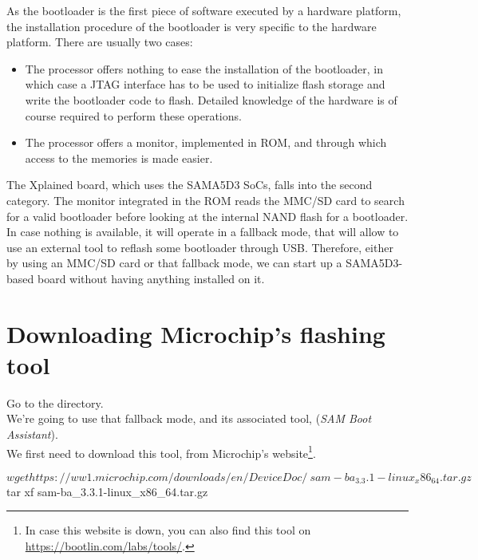 
As the bootloader is the first piece of software executed by a
hardware platform, the installation procedure of the bootloader is
very specific to the hardware platform. There are usually two cases:

\begin{itemize}

\item The processor offers nothing to ease the installation of the
  bootloader, in which case a JTAG interface has to be used to initialize
  flash storage and write the bootloader code to flash. Detailed
  knowledge of the hardware is of course required to perform these
  operations.

\item The processor offers a monitor, implemented in ROM, and through
  which access to the memories is made easier.

\end{itemize}

The Xplained board, which uses the SAMA5D3 SoCs, falls into the second
category. The monitor integrated in the ROM reads the MMC/SD card to
search for a valid bootloader before looking at the internal NAND
flash for a bootloader. In case nothing is available, it will operate
in a fallback mode, that will allow to use an external tool
to reflash some bootloader through USB. Therefore, either by using an MMC/SD
card or that fallback mode, we can start up a SAMA5D3-based board
without having anything installed on it.

\section{Downloading Microchip's flashing tool}

Go to the  directory.\\
We're going to use that fallback mode, and its associated tool,
 ({\em SAM Boot Assistant}).\\
We first need to download this tool, from Microchip's website\footnote{
In case this website is down, you can also find this
tool on \url{https://bootlin.com/labs/tools/}.}.

\begin{bashinput}
$ wget https://ww1.microchip.com/downloads/en/DeviceDoc/\
    sam-ba_3.3.1-linux_x86_64.tar.gz
$ tar xf sam-ba_3.3.1-linux_x86_64.tar.gz
\end{bashinput}

